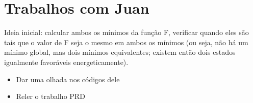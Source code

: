 \section{Trabalhos com Juan}

Ideia inicial: calcular ambos os mínimos da função F, verificar quando eles são tais que o valor de F seja o mesmo em ambos os mínimos (ou seja, não há um mínimo global, mas dois mínimos equivalentes; existem então dois estados igualmente favoráveis energeticamente). 

\begin{itemize}
	\item Dar uma olhada nos códigos dele
	\item Reler o trabalho PRD
\end{itemize}